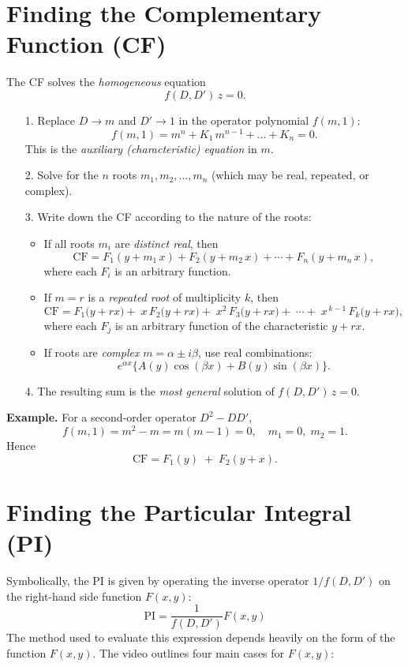 \documentclass{article}
\theoremstyle{remark}
\begin{document}
	\section{Finding the Complementary Function (CF)}
	
	The CF solves the \emph{homogeneous} equation
	\[
	f(D,D')\,z = 0.
	\]
	\begin{itemize}
		\item[1.] Replace $D\to m$ and $D'\to1$ in the operator polynomial $f(m,1)$:
		\[
		f(m,1) = m^n + K_1\,m^{n-1} + \dots + K_n = 0.
		\]
		This is the \emph{auxiliary (characteristic) equation} in $m$.
		\item[2.] Solve for the $n$ roots $m_1,m_2,\dots,m_n$ (which may be real, repeated, or complex).
		\item[3.] Write down the CF according to the nature of the roots:
		\begin{itemize}
			\item If all roots $m_i$ are \emph{distinct real}, then
			\[
			\text{CF} = F_1(y + m_1\,x) + F_2(y + m_2\,x) + \cdots + F_n(y + m_n\,x),
			\]
			where each $F_i$ is an arbitrary function.
			\item If \(m = r\) is a \emph{repeated root} of multiplicity \(k\), then
			\[
			\text{CF} = F_1\bigl(y + r x\bigr)
			+\;x\,F_2\bigl(y + r x\bigr)
			+\;x^2\,F_3\bigl(y + r x\bigr)
			+\;\cdots
			+\;x^{\,k-1}\,F_k\bigl(y + r x\bigr),
			\]
			where each \(F_j\) is an arbitrary function of the characteristic \(y + r x\).
			\item If roots are \emph{complex} $m = \alpha \pm i\beta$, use real combinations:
			\[
			e^{\alpha x}\bigl\{A(y)\cos(\beta x) + B(y)\sin(\beta x)\bigr\}.
			\]
		\end{itemize}
		\item[4.] The resulting sum is the \emph{most general} solution of $f(D,D')\,z=0$.
	\end{itemize}
	
	\textbf{Example.}
	For a second‐order operator $D^2 - DD'$,
	\[
	f(m,1) = m^2 - m = m(m-1)=0,
	\quad m_1=0,\;m_2=1.
	\]
	Hence
	\[
	\boxed{
		\text{CF} = F_1(y) \;+\; F_2(y + x).
	}
	\]
	
	\section{Finding the Particular Integral (PI)}
	
	Symbolically, the PI is given by operating the inverse operator $1/f(D, D')$ on the right-hand side function $F(x, y)$:
	\[
	\text{PI} = \frac{1}{f(D, D')} F(x, y)
	\]
	The method used to evaluate this expression depends heavily on the form of the function $F(x, y)$. The video outlines four main cases for $F(x, y)$:
	
\end{document}
